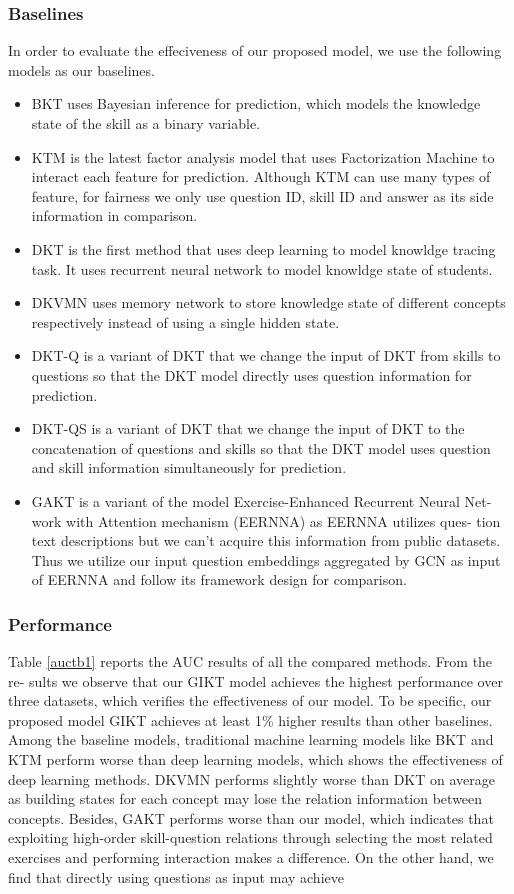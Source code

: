 \documentclass[11pt,en]{elegantpaper}
\begin{document}
\subsubsection{Baselines}
In order to evaluate the effeciveness of our proposed model, we use the following models as our baselines. 
\begin{itemize}
	\item BKT uses Bayesian inference for prediction, which models the knowledge state of the skill as a binary variable.
	\item KTM is the latest factor analysis model that uses Factorization Machine to interact each feature for prediction. Although KTM can use many types of feature, for fairness we only use question ID, skill ID and answer as its side information in comparison.
	\item DKT is the first method that uses deep learning to model knowldge tracing task. It uses recurrent neural network to model knowldge state of students.
	\item DKVMN uses memory network to store knowledge state of different concepts respectively instead of using a single hidden state.
	\item DKT-Q is a variant of DKT that we change the input of DKT from skills to questions so that the DKT model directly uses question information for prediction.
    \item DKT-QS is a variant of DKT that we change the input of DKT to the concatenation of questions and skills so that the DKT model uses question and skill information simultaneously for prediction.
	\item GAKT is a variant of the model Exercise-Enhanced Recurrent Neural Net- work with Attention mechanism (EERNNA) as EERNNA utilizes ques- tion text descriptions but we can't acquire this information from public datasets. Thus we utilize our input question embeddings aggregated by GCN as input of EERNNA and follow its framework design for comparison.
\end{itemize}

\subsubsection{Performance}
Table \ref{auctb1} reports the AUC results of all the compared methods. From the re- sults we observe that our GIKT model achieves the highest performance over three datasets, which verifies the effectiveness of our model. To be specific, our proposed model GIKT achieves at least 1\% higher results than other baselines. Among the baseline models, traditional machine learning models like BKT and KTM perform worse than deep learning models, which shows the effectiveness of deep learning methods. DKVMN performs slightly worse than DKT on average as building states for each concept may lose the relation information between concepts. Besides, GAKT performs worse than our model, which indicates that exploiting high-order skill-question relations through selecting the most related exercises and performing interaction makes a difference. On the other hand, we find that directly using questions as input may achieve
\end{document}
